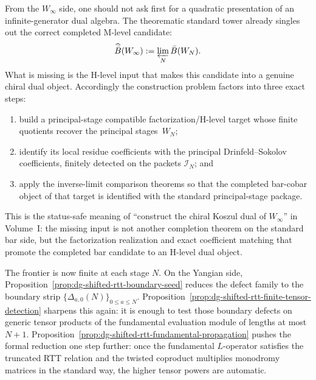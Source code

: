 \begin{remark}
\begin{remark}
\label{rem:winfty-dual-construction-route}
From the \texorpdfstring{$W_\infty$}{W_infty} side, one should not ask
first for a quadratic presentation of an infinite-generator dual
algebra.  The theorematic standard tower already singles out the
correct completed M-level candidate:
\[
\widehat{\bar B}(W_\infty):=\varprojlim_N \bar B(W_N).
\]
What is missing is the H-level input that makes this candidate into a
genuine chiral dual object.  Accordingly the construction problem
factors into three exact steps:
\begin{enumerate}[label=\textup{(\roman*)}]
\item build a principal-stage compatible factorization/H-level target
  whose finite quotients recover the principal stages~$W_N$;
\item identify its local residue coefficients with the principal
  Drinfeld--Sokolov coefficients, finitely detected on the packets
  $\mathcal{I}_N$; and
\item apply the inverse-limit comparison theorems so that the
  completed bar-cobar object of that target is identified with the
  standard principal-stage package.
\end{enumerate}
This is the status-safe meaning of ``construct the chiral Koszul dual
of \texorpdfstring{$W_\infty$}{W_infty}'' in Volume~I: the missing input
is not another completion theorem on the standard bar side, but the
factorization realization and exact coefficient matching that promote
the completed bar candidate to an H-level dual object.
\end{remark}

The frontier is now finite at each stage $N$.  On the Yangian side,
Proposition~\ref{prop:dg-shifted-rtt-boundary-seed} reduces the defect
family to the boundary strip $\{\Delta_{a,0}(N)\}_{0 \le a \le N}$.
Proposition~\ref{prop:dg-shifted-rtt-finite-tensor-detection} sharpens
this again: it is enough to test those boundary defects on generic
tensor products of the fundamental evaluation module of lengths at most
$N+1$.  Proposition~\ref{prop:dg-shifted-rtt-fundamental-propagation}
pushes the formal reduction one step further: once the fundamental
$L$-operator satisfies the truncated RTT relation and the twisted
coproduct multiplies monodromy matrices in the standard way, the higher
tensor powers are automatic.


\end{remark}
